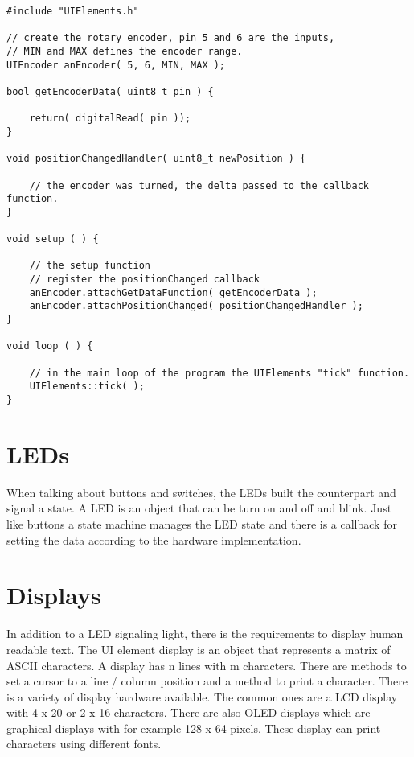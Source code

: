 \lstset{language=c++, style=codesnippetstyle}
\begin{lstlisting}
#include "UIElements.h"

// create the rotary encoder, pin 5 and 6 are the inputs, 
// MIN and MAX defines the encoder range.
UIEncoder anEncoder( 5, 6, MIN, MAX );

bool getEncoderData( uint8_t pin ) {

	return( digitalRead( pin ));
}

void positionChangedHandler( uint8_t newPosition ) {

	// the encoder was turned, the delta passed to the callback function.
}

void setup ( ) {
	
	// the setup function 
	// register the positionChanged callback
	anEncoder.attachGetDataFunction( getEncoderData );
    anEncoder.attachPositionChanged( positionChangedHandler );
}

void loop ( ) {

    // in the main loop of the program the UIElements "tick" function.
	UIElements::tick( );
}
\end{lstlisting}
\FloatBarrier

\section{LEDs}

When talking about buttons and switches, the LEDs built the counterpart and signal a state. A LED is an object that can be turn on and off and blink. Just like buttons a state machine manages the LED state and there is a callback for setting the data according to the hardware implementation.

\section{Displays}

In addition to a LED signaling light, there is the requirements to display human readable text. The UI element display is an object that represents a matrix of ASCII characters. A display has n lines with m characters. There are methods to set a cursor to a line / column position and a method to print a character. There is a variety of display hardware available. The common ones are a LCD display with 4 x 20 or 2 x 16 characters. There are also OLED displays which are graphical displays with for example 128 x 64 pixels. These display can print characters using different fonts.

